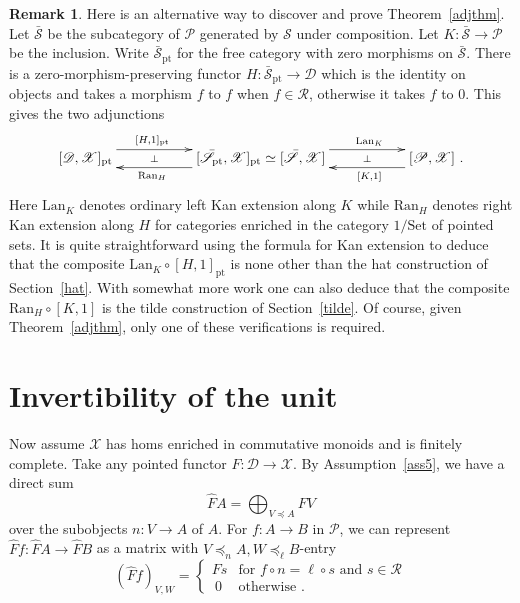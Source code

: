 \documentclass[a4paper,12pt,reqno]{amsart}
\theoremstyle{definition}
\newtheorem{remark}[theorem]{Remark}
\theoremstyle{fact}
\theoremstyle{genquest}
\theoremstyle{step}
\newcommand{\lra}{\longrightarrow}
\newcommand{\ra}{\rightarrow}
\def\CD{{\mathscr D}}
\def\CP{{\mathscr P}}
\def\CR{{\mathscr R}}
\def\CS{{\mathscr S}}
\def\CX{{\mathscr X}}
\begin{document}
\begin{remark}
Here is an alternative way to discover and prove Theorem~\ref{adjthm}. 
Let $\bar{\CS}$ be the subcategory of $\CP$ generated by $\CS$ under composition.
Let $K: \bar{\CS}\lra \CP$ be the inclusion. 
Write $\bar{\CS}_{\mathrm{pt}}$ for the free category with zero morphisms on $\bar{\CS}$.
There is a zero-morphism-preserving functor $H: \bar{\CS}_{\mathrm{pt}}\lra \CD$
which is the identity on objects and takes a morphism $f$ to $f$ when $f\in \CR$,
otherwise it takes $f$ to $0$.
This gives the two adjunctions
\begin{equation}\label{rmktwoadj} 
\xymatrix @R-3mm {
 [\CD,\CX]_{\mathrm{pt}}\ar@<1.5ex>[rr]^{[H,1]_{\mathrm{pt}} \phantom{AAAAA}} \ar@{}[rr]|-{\bot} && [\bar{\CS}_{\mathrm{pt}},\CX]_{\mathrm{pt}} \simeq [\bar{\CS},\CX] 
\ar@<1.5ex>[rr]^{\phantom{AAAAA} \mathrm{Lan}_K}  \ar@{}[rr]|-{\bot} \ar@<1.5ex>[ll]^{\mathrm{Ran}_H \phantom{AAAAA}} && [\CP,\CX]
\ar@<1.5ex>[ll]^{\phantom{AAAAA} [K,1]}  \ .
}
\end{equation}  
Here $\mathrm{Lan}_K$ denotes ordinary left Kan extension along $K$
while $\mathrm{Ran}_H$ denotes right Kan extension along $H$ for categories
enriched in the category $1/\mathrm{Set}$ of pointed sets.
It is quite straightforward using the formula for Kan extension to deduce 
that the composite 
$\mathrm{Lan}_K \circ [H,1]_{\mathrm{pt}}$ is none other than the hat 
construction of Section~\ref{hat}. With somewhat more work one can also
deduce that the composite $\mathrm{Ran}_H \circ [K,1]$ is the tilde construction
of Section~\ref{tilde}. Of course, given Theorem~\ref{adjthm}, only one of these
verifications is required.
\end{remark}

\section{Invertibility of the unit}

Now assume $\CX$ has homs enriched in commutative monoids and is finitely complete.
Take any pointed functor $F:\CD \lra \CX$. 
By Assumption~\ref{ass5}, we have a direct sum 
$$\widehat{F}A = \bigoplus_{V\preceq A}{FV}$$
over the subobjects $n:V\ra A$ of $A$.
For $f:A\ra B$ in $\CP$, we can represent $\widehat{F}f : \widehat{F}A \lra \widehat{F}B$
as a matrix with $V\preceq_n A,W\preceq_{\ell}B$-entry       
\begin{equation*}
(\widehat{F}f)_{V,W} =
\begin{cases}
Fs & \text{for }  f\circ n = \ell \circ s  \text{ and } s \in \CR \\
\ 0 & \text{otherwise } .
\end{cases}
\end{equation*}
\end{document}
